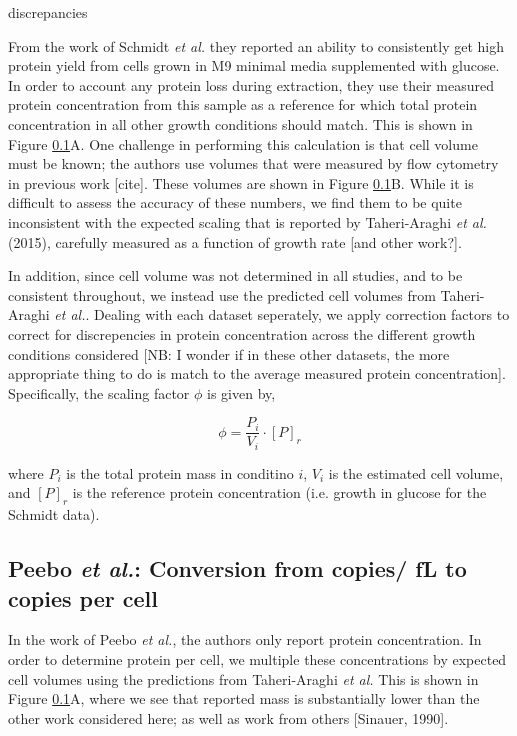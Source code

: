 discrepancies \documentclass[11pt, letterpaper]{article}
\begin{document}
From the work of Schmidt {\it et al.} they reported an ability to consistently get high
protein yield from cells grown in M9 minimal media supplemented with glucose. In order
to account any protein loss during extraction, they use their measured protein concentration
from this sample as a reference for which total protein concentration in all other growth
conditions should match. This is shown in Figure \ref{}A. One challenge in
performing this calculation is that cell volume must be known; the authors use
volumes that were  measured by flow cytometry in previous work [cite]. These
volumes are shown in Figure \ref{}B. While it is difficult to assess the
accuracy of these numbers, we find them to be quite inconsistent with the
expected scaling that is reported by Taheri-Araghi {\it et al.} (2015),
carefully
measured as a function of growth rate [and other work?].

In addition,  since cell volume was not determined in all studies, and to be
consistent throughout, we instead use the predicted cell volumes from
Taheri-Araghi {\it et al.}. Dealing with each dataset seperately, we apply
correction  factors to correct for discrepencies in protein concentration across
the different growth conditions considered [NB: I wonder if in these other
datasets, the more appropriate thing to do is match to the average measured
protein concentration]. Specifically, the scaling factor $\phi$ is given by,

\begin{equation}
\phi  =  \frac{P_i}{V_i} \cdot [P]_r
\end{equation}

where $P_i$ is the total protein mass in conditino $i$, $V_i$ is the estimated cell volume, and $[P]_r$ is
the reference protein concentration (i.e. growth in  glucose for the Schmidt data).


\subsection{Peebo {\it et al.}: Conversion from copies/ fL to copies per cell}

In the work of Peebo {\it et al.}, the authors only report protein concentration.
In  order to determine protein per cell, we multiple these concentrations by
expected cell volumes  using the predictions from  Taheri-Araghi {\it et al.} This is
shown in Figure \ref{}A, where we see that reported mass is substantially lower than
the other work considered here; as well as work from others [Sinauer, 1990].
\end{document}
